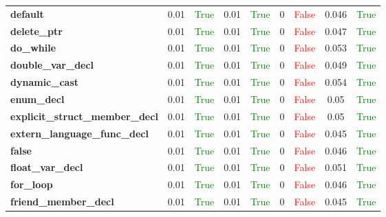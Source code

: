 \documentclass{article}
\begin{document}
\begin{xltabular}{\textwidth}{lcccccccc}
\textbf{{\fontsize{10}{12}\selectfont default}}& 0.01&\textcolor{green}{True}& 0.01&\textcolor{green}{True}& 0&\textcolor{red}{False}& 0.046&\textcolor{green}{True} \\[0.5ex]
\textbf{{\fontsize{10}{12}\selectfont delete\_ptr}}& 0.01&\textcolor{green}{True}& 0.01&\textcolor{green}{True}& 0&\textcolor{red}{False}& 0.047&\textcolor{green}{True} \\[0.5ex]
\textbf{{\fontsize{10}{12}\selectfont do\_while}}& 0.01&\textcolor{green}{True}& 0.01&\textcolor{green}{True}& 0&\textcolor{red}{False}& 0.053&\textcolor{green}{True} \\[0.5ex]
\textbf{{\fontsize{10}{12}\selectfont double\_var\_decl}}& 0.01&\textcolor{green}{True}& 0.01&\textcolor{green}{True}& 0&\textcolor{red}{False}& 0.049&\textcolor{green}{True} \\[0.5ex]
\textbf{{\fontsize{10}{12}\selectfont dynamic\_cast}}& 0.01&\textcolor{green}{True}& 0.01&\textcolor{green}{True}& 0&\textcolor{red}{False}& 0.054&\textcolor{green}{True} \\[0.5ex]
\textbf{{\fontsize{10}{12}\selectfont enum\_decl}}& 0.01&\textcolor{green}{True}& 0.01&\textcolor{green}{True}& 0&\textcolor{red}{False}& 0.05&\textcolor{green}{True} \\[0.5ex]
\textbf{{\fontsize{10}{12}\selectfont explicit\_struct\_member\_decl}}& 0.01&\textcolor{green}{True}& 0.01&\textcolor{green}{True}& 0&\textcolor{red}{False}& 0.05&\textcolor{green}{True} \\[0.5ex]
\textbf{{\fontsize{10}{12}\selectfont extern\_language\_func\_decl}}& 0.01&\textcolor{green}{True}& 0.01&\textcolor{green}{True}& 0&\textcolor{red}{False}& 0.045&\textcolor{green}{True} \\[0.5ex]
\textbf{{\fontsize{10}{12}\selectfont false}}& 0.01&\textcolor{green}{True}& 0.01&\textcolor{green}{True}& 0&\textcolor{red}{False}& 0.046&\textcolor{green}{True} \\[0.5ex]
\textbf{{\fontsize{10}{12}\selectfont float\_var\_decl}}& 0.01&\textcolor{green}{True}& 0.01&\textcolor{green}{True}& 0&\textcolor{red}{False}& 0.051&\textcolor{green}{True} \\[0.5ex]
\textbf{{\fontsize{10}{12}\selectfont for\_loop}}& 0.01&\textcolor{green}{True}& 0.01&\textcolor{green}{True}& 0&\textcolor{red}{False}& 0.046&\textcolor{green}{True} \\[0.5ex]
\textbf{{\fontsize{10}{12}\selectfont friend\_member\_decl}}& 0.01&\textcolor{green}{True}& 0.01&\textcolor{green}{True}& 0&\textcolor{red}{False}& 0.045&\textcolor{green}{True} \\[0.5ex]

\end{xltabular}
\end{document}
